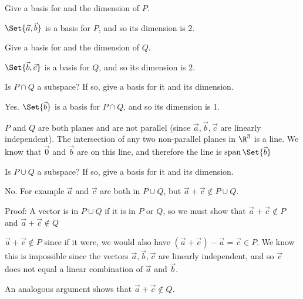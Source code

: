 	\begin{parts}
		\item Give a basis for and the dimension of $P$.
			\begin{solution}
				$\Set{\vec a,\vec b}$ is a basis for $P$, and so its dimension is 2.
			\end{solution}
		\item Give a basis for and the dimension of $Q$.
			\begin{solution}
				$\Set{\vec b,\vec c}$ is a basis for $Q$, and so its dimension is 2.
			\end{solution}
		\item Is $P\cap Q$ a subspace? If so, give a basis for it and its dimension.
			\begin{solution}
				Yes. $\Set{\vec b}$ is a basis for $P\cap Q$, and so its dimension is 1.

				$P$ and $Q$ are both planes and are not parallel (since
				$\vec a,\vec b,\vec c$ are linearly independent). The intersection
				of any two non-parallel	planes in $\R^3$ is a line.
				We know that $\vec 0$ and $\vec b$ are on this line, and therefore
				the line is $\Span\Set{\vec b}$
			\end{solution}
		\item Is $P\cup Q$ a subspace? If so, give a basis for it and its dimension.
			\begin{solution}
				No. For example $\vec a$ and $\vec c$ are both in $P\cup Q$, but
				$\vec a+\vec c \notin P\cup Q$.

				Proof: A vector is in $P\cup Q$ if it is in $P$ or $Q$, so we must show
				that $\vec a+\vec c\notin P$ and $\vec a+\vec c\notin Q$

				$\vec a+\vec c \notin P$ since if it were, we would also have
				$(\vec a+\vec c)-\vec a=\vec c\in P$. We know this is impossible
				since the vectors $\vec a,\vec b,\vec c$ are linearly independent,
				and so $\vec c$ does not equal a linear combination of $\vec a$
				and $\vec b$.

				An analogous argument shows that $\vec a+\vec c \notin Q$.
			\end{solution}
	\end{parts}

